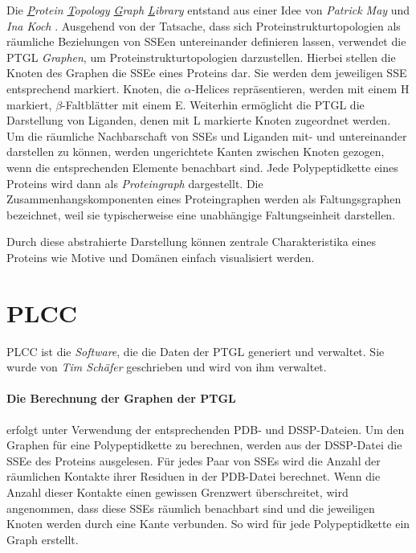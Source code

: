 \documentclass{report}
\begin{document}
Die \textit{\underline{P}rotein \underline{T}opology \underline{G}raph \underline{L}ibrary} entstand aus einer Idee von \textit{Patrick May} und \textit{Ina Koch} \cite{ptgl1}. Ausgehend von der Tatsache, dass sich Proteinstrukturtopologien als r\"aumliche Beziehungen von SSEen untereinander definieren lassen, verwendet die PTGL \emph{Graphen}, um Proteinstrukturtopologien darzustellen.
Hierbei stellen die Knoten des Graphen die SSEe eines Proteins dar. Sie werden dem jeweiligen SSE entsprechend markiert. Knoten, die $\alpha$-Helices repr\"asentieren, werden mit einem H markiert, $\beta$-Faltbl\"atter mit einem E. Weiterhin erm\"oglicht die PTGL die Darstellung von Liganden, \cite{vplg} denen mit L markierte Knoten zugeordnet werden. Um die r\"aumliche Nachbarschaft von SSEs und Liganden mit- und untereinander darstellen zu k\"onnen, werden ungerichtete Kanten zwischen Knoten gezogen, wenn die entsprechenden Elemente benachbart sind. Jede Polypeptidkette eines Proteins wird dann als \emph{Proteingraph} dargestellt. Die Zusammenhangskomponenten eines Proteingraphen werden als Faltungsgraphen bezeichnet, weil sie typischerweise eine unabh\"angige Faltungseinheit darstellen.

Durch diese abstrahierte Darstellung k\"onnen zentrale Charakteristika eines Proteins wie Motive und Dom\"anen einfach visualisiert werden.


\section{PLCC}

PLCC ist die \textit{Software}, die die Daten der PTGL generiert und verwaltet. Sie wurde von \textit{Tim Sch\"afer} geschrieben und  wird von ihm verwaltet.


\paragraph{Die Berechnung der Graphen der PTGL}

erfolgt unter Verwendung der entsprechenden PDB- und DSSP-Dateien. Um den Graphen f\"ur eine Polypeptidkette zu berechnen, werden aus der DSSP-Datei die SSEe des Proteins ausgelesen. F\"ur jedes Paar von SSEs wird die Anzahl der r\"aumlichen Kontakte ihrer Residuen in der PDB-Datei berechnet. Wenn die Anzahl dieser Kontakte einen gewissen Grenzwert \"uberschreitet, wird angenommen, dass diese SSEs r\"aumlich benachbart sind und die jeweiligen Knoten werden durch eine Kante verbunden. So wird f\"ur jede Polypeptidkette ein Graph erstellt.
\end{document}

